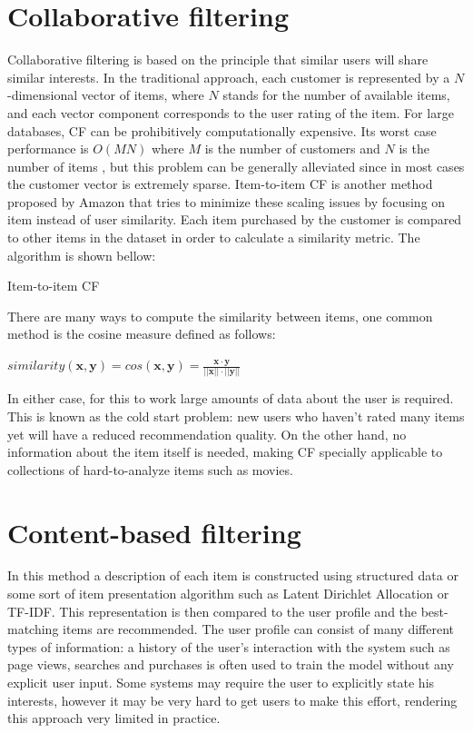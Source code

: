 \documentclass[cic,tc,english]{iiufrgs}
\begin{document}
\section{Collaborative filtering}
Collaborative filtering is based on the principle that similar users will share similar interests. In the traditional approach, each customer is represented by a \(N\)-dimensional vector of items, where \(N\) stands for the number of available items, and each vector component corresponds to the user rating of the item. For large databases, CF can be prohibitively computationally expensive. Its worst case performance is \(O(MN)\) where \(M\) is the number of customers and \(N\) is the number of items \cite{Linden2003}, but this problem can be generally alleviated since in most cases the customer vector is extremely sparse. Item-to-item CF is another method proposed by Amazon that tries to minimize these scaling issues by focusing on item instead of user similarity. Each item purchased by the customer is compared to other items in the dataset in order to calculate a similarity metric. The algorithm is shown bellow:

\begin{algorithm}[H]
 \caption{Item-to-item CF}
\end{algorithm}

There are many ways to compute the similarity between items, one common method is the cosine measure defined as follows:

\(similarity(\pmb x, \pmb y) = cos(\pmb x, \pmb y) = \frac {\pmb x \cdot \pmb y}{||\pmb x|| \cdot ||\pmb y||}\)


In either case, for this to work large amounts of data about the user is required. This is known as the cold start problem: new users who haven't rated many items yet will have a reduced recommendation quality. On the other hand, no information about the item itself is needed, making CF specially applicable to collections of hard-to-analyze items such as movies.

\section{Content-based filtering}
In this method a description of each item is constructed using structured data or some sort of item presentation algorithm such as Latent Dirichlet Allocation or TF-IDF. This representation is then compared to the user profile and the best-matching items are recommended. The user profile can consist of many different types of information: a history of the user's interaction with the system such as page views, searches and purchases is often used to train the model without any explicit user input. Some systems may require the user to explicitly state his interests, however it may be very hard to get users to make this effort, rendering this approach very limited in practice.
\end{document}
